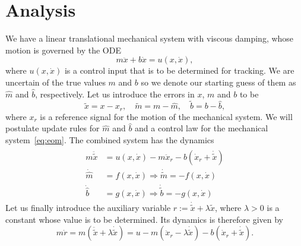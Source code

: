 \section{Analysis} 
\label{sec:analysis}

We have a linear translational mechanical system with viscous damping, whose
motion is governed by the ODE
%
\begin{equation}
    m \ddot{x} + b\dot{x} = u(x, \dot{x}),
    \label{eq:eom}
\end{equation}
%
where $u(x, \dot{x})$ is a control input that is to be determined for tracking. We are
uncertain of the true values $m$ and $b$ so we denote our starting guess of them
as $\hat{m}$ and $\hat{b}$, respectively. Let us introduce the errors in $x$,
$m$ and $b$ to be \[ \tilde{x} = x - x_r, \quad \tilde{m} = m - \hat{m}, \quad
\tilde{b} = b - \hat{b}, \] where $x_r$ is a reference signal for the motion of
the mechanical system. We will postulate update rules for $\hat{m}$ and
$\hat{b}$ and a control law for the mechanical system~\eqref{eq:eom}. The
combined system has the dynamics
%
\begin{align}
    \begin{split}
    m\ddot{\tilde{x}} &= u(x, \dot{x}) - m\ddot{x}_r - b(\dot{x}_r + \dot{\tilde{x}}) \\
    \dot{\hat{m}} &= f(x, \dot{x}) \Rightarrow \dot{\tilde{m}} = -f(x, \dot{x}) \\
    \dot{\hat{b}} &= g(x, \dot{x}) \Rightarrow \dot{\tilde{b}} = -g(x, \dot{x})
    \end{split}
    \label{eq:combined}
\end{align}
%
Let us finally introduce the auxiliary variable $r := \dot{\tilde{x}} + \lambda
\tilde{x}$, where $\lambda > 0$ is a constant whose value is to be determined.
Its dynamics is therefore given by \[ m\dot{r} = m\left(\ddot{\tilde{x}} +
\lambda \dot{\tilde{x}}\right) = u - m(\ddot{x}_r - \lambda\dot{\tilde{x}}) - 
b(\dot{x}_r + \dot{\tilde{x}}). \]

